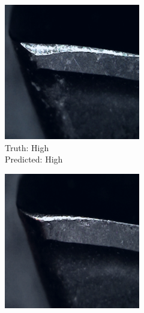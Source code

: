 \begin{figure}[hbtp]
	\begin{subfigure}{0.31\textwidth}
	\centering
	\includegraphics[width=\linewidth]{fig/results/wandb/second_handmade_sweep/images/pred0-truth0.png}
	\caption{Truth: High \\Predicted: High}
	\end{subfigure}
	\hspace*{\fill}
	\begin{subfigure}{0.31\textwidth}
	\centering
	\includegraphics[width=\linewidth]{fig/results/wandb/second_handmade_sweep/images/pred2-truth2.png}

\end{subfigure}
\end{figure}

